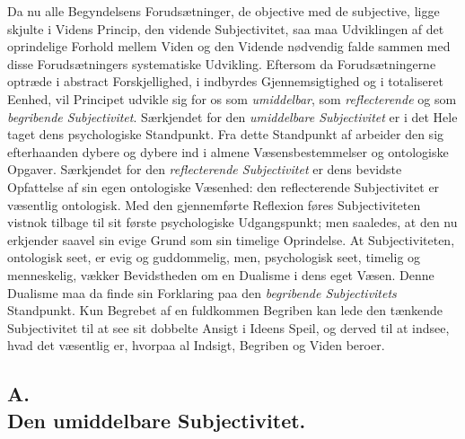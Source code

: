 \documentclass[11pt]{book}
\newcommand{\opage}[1]{\marginnote{\footnotesize\textit{[#1]}}}
\begin{document}
\opage{11} \setcounter{footnote}{0}%
Da nu alle Begyndelsens Forudsætninger, de objective med de subjective,
ligge skjulte i Videns Princip, den vidende Subjectivitet, saa maa
Udviklingen af det oprindelige Forhold mellem Viden og den Vidende
nødvendig falde sammen med disse Forudsætningers systematiske
Udvikling. Eftersom da Forudsætningerne optræde i abstract
Forskjellighed, i indbyrdes Gjennemsigtighed og i totaliseret Eenhed,
vil Principet udvikle sig for os som \emph{umiddelbar}, som
\emph{reflecterende} og som \emph{begribende Subjectivitet}.
Særkjendet for den \emph{umiddelbare Subjectivitet} er i det Hele taget
dens psychologiske Standpunkt. Fra dette Standpunkt af arbeider den
sig efterhaanden dybere og dybere ind i almene Væsensbestemmelser og
ontologiske Opgaver. Særkjendet for den \emph{reflecterende
Subjectivitet} er dens bevidste Opfattelse af sin egen ontologiske
Væsenhed: den reflecterende Subjectivitet er væsentlig ontologisk. Med
den gjennemførte Reflexion føres Subjectiviteten vistnok tilbage til
sit første psychologiske Udgangspunkt; men saaledes, at den nu
erkjender saavel sin evige Grund som sin timelige Oprindelse. At
Subjectiviteten, ontologisk seet, er evig og guddommelig, men,
psychologisk seet, timelig og menneskelig, vækker Bevidstheden om en
Dualisme i dens eget Væsen. Denne Dualisme maa da finde sin Forklaring
paa den \emph{begribende Subjectivitets} Standpunkt. Kun Begrebet af
en fuldkommen Begriben kan lede den tænkende Subjectivitet til at see
sit dobbelte Ansigt i Ideens Speil, og derved til at indsee, hvad det
væsentlig er, hvorpaa al Indsigt, Begriben og Viden beroer.
\subsection*{A.\\ Den umiddelbare Subjectivitet.}
\end{document}
